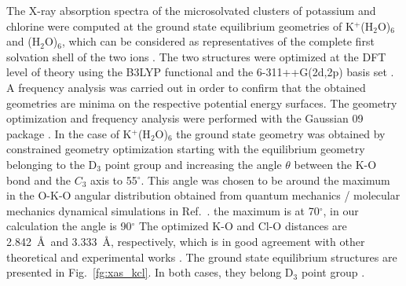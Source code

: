 The X-ray absorption spectra of the microsolvated clusters of potassium and chlorine were computed at the ground state equilibrium geometries of K$^+$(H$_2$O)$_6$ and \cli(H$_2$O)$_6$, which can be considered as representatives of the complete first solvation shell of the two ions \citep{Ohtaki93:1157,soper06:180,ma14:1006}. The two structures were optimized at the DFT level of theory using the B3LYP functional and the 6-311++G(2d,2p) basis set \citep{Krishnan80:650,Blaudeau97:5016}. A frequency analysis was carried out in order to confirm that the obtained geometries are minima on the respective potential energy surfaces. The geometry optimization and frequency analysis were performed with the Gaussian 09 package \citep{g09}. In the case of K$^{+}$(H$_2$O)$_6$ the ground state geometry was obtained by constrained geometry optimization starting with the equilibrium geometry \citep{lee99:3995} belonging to the D$_3$ point group and increasing the angle $\theta$ between the K-O bond and the $C_3$ axis to 55$^{\circ}$. This angle was chosen to be around the maximum in the O-K-O angular distribution obtained from quantum mechanics / molecular mechanics dynamical simulations in Ref.\ \citep{ma14:1006}. {\color{red} the maximum is at 70$^{\circ}$, in our calculation the angle is 90$^{\circ}$} The optimized K-O and Cl-O distances are 2.842~\AA~and 3.333~\AA, respectively, which is in good agreement with other theoretical and experimental works \citep{ge13:13169,gora00:7,Ohtaki93:1157,soper06:180,ma14:1006}. The ground state equilibrium structures are presented in Fig.\ \ref{fg:xas_kcl}. In both cases, they belong D$_3$ point group \citep{rao08:12944,ge13:13169}. 


